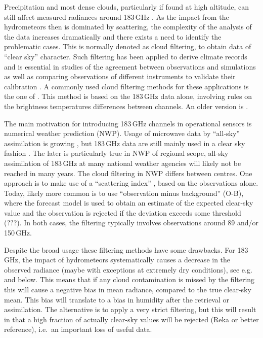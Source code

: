 \documentclass[amt, manuscript]{copernicus}
\newcommand{\todo}[1]{{\color{red} #1}}
\begin{document}
Precipitation and most dense clouds, particularly if found at high altitude, can
still affect measured radiances around 183\,GHz
\citep[e.g.][]{bennartz2003sensitivity}. As the impact from the hydrometeors
then is dominated by scattering, the complexity of the analysis of the data
increases dramatically and there exists a need to identify the problematic
cases. This is normally denoted as cloud filtering, to obtain data of ``clear
sky'' character. Such filtering has been applied to derive climate records
\citep{lang2020new} and is essential in studies of the agreement between
observations and simulations \citep{brogniez2016review} as well as 
comparing observations of different instruments to validate their calibration
\citep{john2013assessment,moradi:retri:15,berg2016intercalibration}. A commonly
used cloud filtering methods for these applications is the one of
\citet{buehler:aclou:07}. This method is based on the 183\,GHz data alone,
involving rules on the brightness temperatures differences between channels. An
older version is \citet{burns1997effects}.

The main motivation for introducing 183\,GHz channels in operational sensors is
numerical weather prediction (NWP). Usage of microwave data by ``all-sky''
assimilation is growing \citep{geer2017growing}, but 183\,GHz data are still
mainly used in a clear sky fashion \citep{geer2018all}. The later is
particularly true in NWP of regional scope, all-sky assimilation of 183\,GHz at
many national weather agencies will likely not be reached in many years. The
cloud filtering in NWP differs between centres. One approach is to make use of
a ``scattering index'' \citep{bennartz2002precipitation}, based on the
observations alone. Today, likely more common is to use ``observation minus
background'' (O-B), where the forecast model is used to obtain an estimate of
the expected clear-sky value and the observation is rejected if the deviation
exceeds some threshold (???). In both cases, the filtering typically involves
observations around 89 and/or 150\,GHz.

Despite the broad usage these filtering methods have some drawbacks. For
183\,GHz, the impact of hydrometeors systematically causes a decrease in the
observed radiance (maybe with exceptions at extremely dry conditions), see
e.g.\ \citet{barlakas:three:20} and below. This means that if any cloud
contamination is missed by the filtering this will cause a negative bias in
mean radiance, compared to the true clear-sky mean. This bias will translate to
a bias in humidity after the retrieval or assimilation. The alternative is to
apply a very strict filtering, but this will result in that a high fraction of
actually clear-sky values will be rejected \todo{(Reka or better reference)},
i.e.\ an important loss of useful data.
\end{document}

